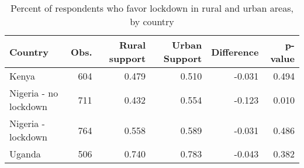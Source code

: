 \begin{table}[ht]
\centering
\caption{Percent of respondents who favor lockdown in rural and urban areas, by country} 
\label{tab:lock_urban_rural}
\begin{tabular}{lrrrrr}
  \hline
Country & Obs. & Rural support & Urban Support & Difference & p-value \\ 
  \hline
Kenya &  604 & 0.479 & 0.510 & -0.031 & 0.494 \\ 
  Nigeria - no lockdown &  711 & 0.432 & 0.554 & -0.123 & 0.010 \\ 
  Nigeria - lockdown &  764 & 0.558 & 0.589 & -0.031 & 0.486 \\ 
  Uganda &  506 & 0.740 & 0.783 & -0.043 & 0.382 \\ 
   \hline
\end{tabular}
\end{table}

